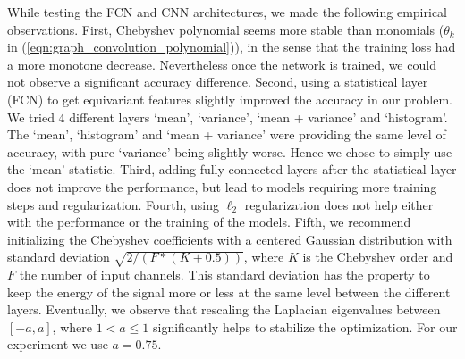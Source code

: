 \documentclass[final,twocolumn,3p,times,authoryear]{elsarticle}
\newcommand{\nati}[1]{{\color[rgb]{.1,.6,.1}{#1}}}
\newcommand{\TK}[1]{{\color{red}{TK:#1}}}
\newcommand{\eqnref}[1]{(\ref{eqn:#1})}
\newcommand{\1}{\b{1}}              %
\newcommand{\0}{\b{0}}              %
\begin{document}

\nati{Michael: I am highly uncertain of what should be kept in the following paragraph. Maybe the full paragraph should be left out!}
While testing the FCN and CNN architectures, we made the following empirical observations.
First, Chebyshev polynomial seems more stable than monomials ($\theta_k$ in \eqnref{graph_convolution_polynomial}), in the sense that the training loss had a more monotone decrease.
Nevertheless once the network is trained, we could not observe a significant accuracy difference.
Second, using a statistical layer (FCN) to get equivariant features slightly improved the accuracy in our problem.
We tried $4$ different layers `mean', `variance', `mean + variance' and `histogram'.
The `mean', `histogram' and `mean + variance' were providing the same level of accuracy, with pure `variance' being slightly worse. Hence we chose to simply use the `mean' statistic.
Third, adding fully connected layers after the statistical layer does not improve the performance, but lead to models requiring more training steps and regularization.
Fourth, using $\ell_2$ regularization does not help either with the performance or the training of the models.
Fifth, we recommend initializing the Chebyshev coefficients with a centered Gaussian distribution with standard deviation $\sqrt{2/(F * (K + 0.5))}$, where $K$ is the Chebyshev order and $F$ the number of input channels. This standard deviation has the property to keep the energy of the signal more or less at the same level between the different layers.
Eventually, we observe that rescaling the Laplacian eigenvalues between $[-a,a]$, where $1<a\leq1$ significantly helps to stabilize the optimization. For our experiment we use $a=0.75$.
\end{document}
